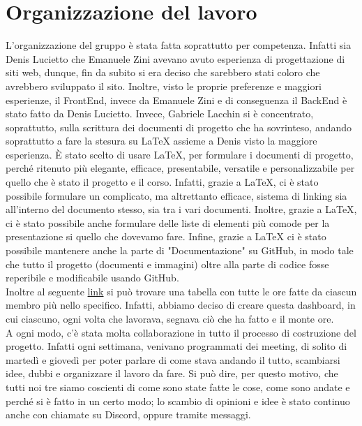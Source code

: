 \documentclass{article}
\begin{document}

\pagebreak

\tableofcontents
\pagebreak

\section{Organizzazione del lavoro}

L'organizzazione del gruppo è stata fatta soprattutto per competenza. Infatti sia Denis Lucietto che Emanuele Zini avevano avuto esperienza di progettazione di siti web, dunque, fin da subito si era deciso che sarebbero stati coloro che avrebbero sviluppato il sito. Inoltre, visto le proprie preferenze e maggiori esperienze, il FrontEnd, invece da Emanuele Zini e di conseguenza il BackEnd è stato fatto da Denis Lucietto. Invece, Gabriele Lacchin si è concentrato, soprattutto, sulla scrittura dei documenti di progetto che ha sovrinteso, andando soprattutto a fare la stesura su LaTeX assieme a Denis visto la maggiore esperienza. È stato scelto di usare LaTeX, per formulare i documenti di progetto, perché ritenuto più elegante, efficace, presentabile, versatile e personalizzabile per quello che è stato il progetto e il corso. Infatti, grazie a LaTeX, ci è stato possibile formulare un complicato, ma altrettanto efficace, sistema di linking sia all'interno del documento stesso, sia tra i vari documenti. Inoltre, grazie a LaTeX, ci è stato possibile anche formulare delle liste di elementi più comode per la presentazione si quello che dovevamo fare. Infine, grazie a LaTeX ci è stato possibile mantenere anche la parte di "Documentazione" su GitHub, in modo tale che tutto il progetto (documenti e immagini) oltre alla parte di codice fosse reperibile e modificabile usando GitHub. \\
Inoltre al seguente \href{https://www.notion.so/00afd2533fec4cae9120d119bfb7c9a1?v=332b02dda53744719f961bed09df9116}{link} si può trovare una tabella con tutte le ore fatte da ciascun membro più nello specifico. Infatti, abbiamo deciso di creare questa dashboard, in cui ciascuno, ogni volta che lavorava, segnava ciò che ha fatto e il monte ore.\\
A ogni modo, c'è stata molta collaborazione in tutto il processo di costruzione del progetto. Infatti ogni settimana, venivano programmati dei meeting, di solito di martedì e giovedì per poter parlare di come stava andando il tutto, scambiarsi idee, dubbi e organizzare il lavoro da fare. Si può dire, per questo motivo, che tutti noi tre siamo coscienti di come sono state fatte le cose, come sono andate e perché si è fatto in un certo modo; lo scambio di opinioni e idee è stato continuo anche con chiamate su Discord, oppure tramite messaggi.
\newpage
\end{document}
